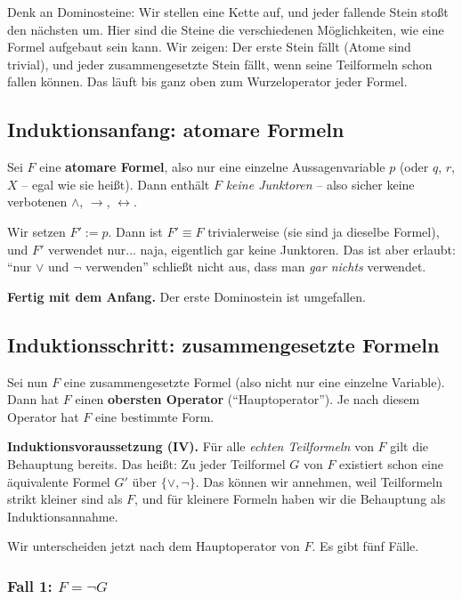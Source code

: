 \documentclass[a4paper,12pt]{article}
\begin{document}
\begin{analogie}[title={Analogie: Dominokette}]
Denk an Dominosteine: Wir stellen eine Kette auf, und jeder fallende
Stein sto{\ss}t den n\"achsten um. Hier sind die Steine die
verschiedenen M\"oglichkeiten, wie eine Formel aufgebaut sein kann.
Wir zeigen: Der erste Stein f\"allt (Atome sind trivial), und jeder
zusammengesetzte Stein f\"allt, wenn seine Teilformeln schon fallen
k\"onnen. Das l\"auft bis ganz oben zum Wurzeloperator jeder Formel.
\end{analogie}

\subsection*{Induktionsanfang: atomare Formeln}

Sei $F$ eine \textbf{atomare Formel}, also nur eine einzelne
Aussagenvariable $p$ (oder $q$, $r$, $X$ -- egal wie sie hei{\ss}t).
Dann enth\"alt $F$ \emph{keine Junktoren} -- also sicher keine
verbotenen $\wedge$, $\to$, $\leftrightarrow$.

Wir setzen $F' := p$. Dann ist $F' \equiv F$ trivialerweise (sie sind
ja dieselbe Formel), und $F'$ verwendet nur... naja, eigentlich gar
keine Junktoren. Das ist aber erlaubt: "`nur $\vee$ und $\neg$
verwenden"' schlie{\ss}t nicht aus, dass man \emph{gar nichts}
verwendet.

\textbf{Fertig mit dem Anfang.} Der erste Dominostein ist umgefallen.

\subsection*{Induktionsschritt: zusammengesetzte Formeln}

Sei nun $F$ eine zusammengesetzte Formel (also nicht nur eine
einzelne Variable). Dann hat $F$ einen \textbf{obersten Operator}
("`Hauptoperator"'). Je nach diesem Operator hat $F$ eine
bestimmte Form.

\textbf{Induktionsvoraussetzung (IV).} F\"ur alle \emph{echten
Teilformeln} von $F$ gilt die Behauptung bereits. Das hei{\ss}t:
Zu jeder Teilformel $G$ von $F$ existiert schon eine
\"aquivalente Formel $G'$ \"uber $\{\vee, \neg\}$. Das k\"onnen wir
annehmen, weil Teilformeln strikt kleiner sind als $F$, und f\"ur
kleinere Formeln haben wir die Behauptung als Induktionsannahme.

Wir unterscheiden jetzt nach dem Hauptoperator von $F$. Es gibt f\"unf
F\"alle.

\subsubsection*{Fall 1: $F = \neg G$}
\end{document}

